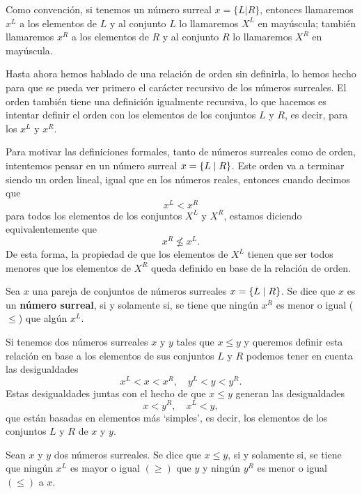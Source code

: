     Como convención, si tenemos un número surreal $x=\{L|R\}$, entonces llamaremos $x^L$ a los elementos de $L$ y al conjunto $L$ lo llamaremos $X^L$ en may\'uscula; tambi\'en llamaremos $x^R$ a los elementos de $R$ y al conjunto $R$ lo llamaremos $X^R$ en may\'uscula.

    Hasta ahora hemos hablado de una relaci\'on de orden sin definirla, lo hemos hecho para que se pueda ver primero el car\'acter recursivo de los n\'umeros surreales. El orden tambi\'en tiene una definici\'on igualmente recursiva, lo que hacemos es intentar definir el orden con los elementos de los conjuntos $L$ y $R$, es decir, para los $x^L$ y $x^R$.

    Para motivar las definiciones formales, tanto de n\'umeros surreales como de orden, intentemos pensar en un n\'umero surreal $x = \left\{L\mid R\right\}$. Este orden va a terminar siendo un orden lineal, igual que en los n\'umeros reales, entonces cuando decimos que
    \[
        x^L < x^R
    \]
    para todos los elementos de los conjuntos $X^L$ y $X^R$, estamos diciendo equivalentemente que
    \[
        x^R \not\le x^L.
    \]
    De esta forma, la propiedad de que los elementos de $X^L$ tienen que ser todos menores que los elementos de $X^R$ queda definido en base de la relaci\'on de orden.

    \begin{definition}
        Sea $x$ una pareja de conjuntos de n\'umeros surreales $x=\left\{L\mid R\right\}$. Se dice que $x$ es un \textbf{n\'umero surreal}, si y solamente si, se tiene que ningún $x^R$ es menor o igual ($\le$) que algún $x^L$. 
    \end{definition}

    Si tenemos dos n\'umeros surreales $x$ y $y$ tales que $x\le y$ y queremos definir esta relaci\'on en base a los elementos de sus conjuntos $L$ y $R$ podemos tener en cuenta las desigualdades
    \[
        x^L < x < x^R,\quad y^L < y < y^R.
    \]
    Estas desigualdades juntas con el hecho de que $x\le y$ generan las desigualdades
    \[
        x < y^R,\quad x^L < y,
    \]
    que est\'an basadas en elementos m\'as `simples', es decir, los elementos de los conjuntos $L$ y $R$ de $x$ y $y$.

    \begin{definition}
        Sean $x$ y $y$ dos n\'umeros surreales. Se dice que $x\le y$, si y solamente si, se tiene que ning\'un $x^L$ es mayor o igual $(\ge)$ que $y$ y ningún $y^R$ es menor o igual $(\le)$ a $x$.
    \end{definition}

